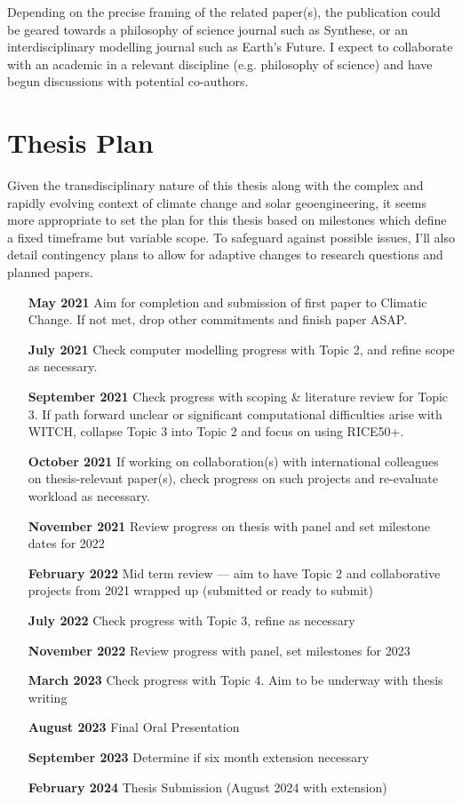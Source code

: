 \documentclass{article}
\begin{document}
Depending on the precise framing of the related paper(s), the publication could be geared towards a philosophy of science journal such as Synthese, or an interdisciplinary modelling journal such as Earth's Future. I expect to collaborate with an academic in a relevant discipline (e.g. philosophy of science) and have begun discussions with potential co-authors.
\clearpage
\section*{Thesis Plan}
Given the transdisciplinary nature of this thesis along with the complex and rapidly evolving context of climate change and solar geoengineering, it seems more appropriate to set the plan for this thesis based on milestones which define a fixed timeframe but variable scope. To safeguard against possible issues, I'll also detail contingency plans to allow for adaptive changes to research questions and planned papers.

\begin{itemize}
    \item[\textbf{May 2021}] Aim for completion and submission of first paper to Climatic Change. If not met, drop other commitments and finish paper ASAP.
    \item[\textbf{July 2021}] Check computer modelling progress with Topic 2, and refine scope as necessary.
    \item[\textbf{September 2021}] Check progress with scoping \& literature review for Topic 3. If path forward unclear or significant computational difficulties arise with WITCH, collapse Topic 3 into Topic 2 and focus on using RICE50+.
    \item[\textbf{October 2021}] If working on collaboration(s) with international colleagues on thesis-relevant paper(s), check progress on such projects and re-evaluate workload as necessary. 
    \item[\textbf{November 2021}] Review progress on thesis with panel and set milestone dates for 2022
    \item[\textbf{February 2022}] Mid term review --- aim to have Topic 2 and collaborative projects from 2021 wrapped up (submitted or ready to submit)
    \item[\textbf{July 2022}] Check progress with Topic 3, refine as necessary
    \item[\textbf{November 2022}] Review progress with panel, set milestones for 2023
    \item[\textbf{March 2023}] Check progress with Topic 4. Aim to be underway with thesis writing
    \item[\textbf{August 2023}] Final Oral Presentation
    \item[\textbf{September 2023}] Determine if six month extension necessary
    \item[\textbf{February 2024}] Thesis Submission (August 2024 with extension)
\end{itemize}
\end{document}
